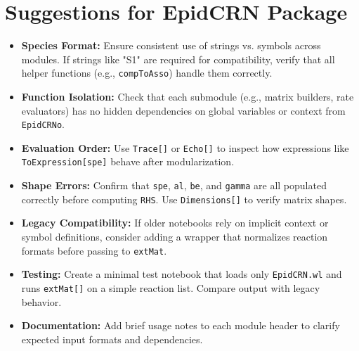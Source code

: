 \documentclass{article}
\begin{document}
\section*{Suggestions for EpidCRN Package}

\begin{itemize}
  \item \textbf{Species Format:} Ensure consistent use of strings vs. symbols across modules. If strings like "S1" are required for compatibility, verify that all helper functions (e.g., \texttt{compToAsso}) handle them correctly.

  \item \textbf{Function Isolation:} Check that each submodule (e.g., matrix builders, rate evaluators) has no hidden dependencies on global variables or context from \texttt{EpidCRNo}.

  \item \textbf{Evaluation Order:} Use \texttt{Trace[]} or \texttt{Echo[]} to inspect how expressions like \texttt{ToExpression[spe]} behave after modularization.

  \item \textbf{Shape Errors:} Confirm that \texttt{spe}, \texttt{al}, \texttt{be}, and \texttt{gamma} are all populated correctly before computing \texttt{RHS}. Use \texttt{Dimensions[]} to verify matrix shapes.

  \item \textbf{Legacy Compatibility:} If older notebooks rely on implicit context or symbol definitions, consider adding a wrapper that normalizes reaction formats before passing to \texttt{extMat}.

  \item \textbf{Testing:} Create a minimal test notebook that loads only \texttt{EpidCRN.wl} and runs \texttt{extMat[]} on a simple reaction list. Compare output with legacy behavior.

  \item \textbf{Documentation:} Add brief usage notes to each module header to clarify expected input formats and dependencies.

\end{itemize}
\end{document}
